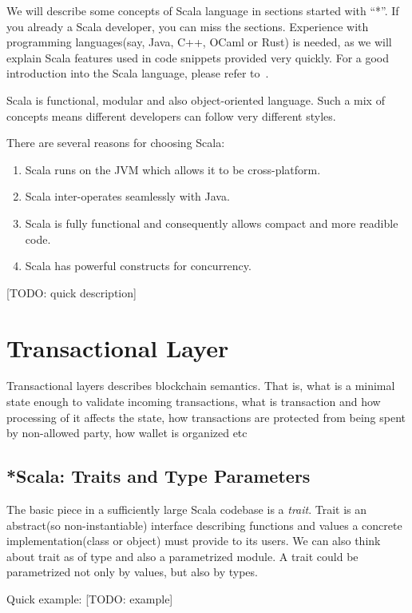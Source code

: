 \documentclass[]{report}   %
\begin{document}
We will describe some concepts of Scala language in sections started with ``*''. If you already a Scala developer, you can miss the sections. Experience with programming languages(say, Java, C++, OCaml or Rust) is needed, as we will explain Scala features used in code snippets provided very quickly. For a good introduction into the Scala language, please refer to~\cite{odersky2008programming}.

Scala is functional, modular and also object-oriented language. Such a mix of concepts means different developers can follow very different styles. 

There are several reasons for choosing Scala:
\begin{enumerate}
	\item Scala runs on the JVM which allows it to be cross-platform.
	\item Scala inter-operates seamlessly with Java.
	\item Scala is fully functional and consequently allows compact and more readible code.
	\item Scala has powerful constructs for concurrency.
	
\end{enumerate}

[TODO: quick description]

\section{Transactional Layer}

Transactional layers describes blockchain semantics. That is, what is a minimal state enough to validate incoming transactions, what is transaction and how processing of it affects the state, how transactions are protected from being spent by non-allowed party, how wallet is organized etc

\subsection{*Scala: Traits and Type Parameters}

The basic piece in a sufficiently large Scala codebase is a \textit{trait}. Trait is an abstract(so non-instantiable) interface describing functions and values a concrete implementation(class or object) must provide to its users. We can also think about trait as of type and also a parametrized module. A trait could be parametrized not only by values, but also by types. 

Quick example: 
[TODO: example]
\end{document}
